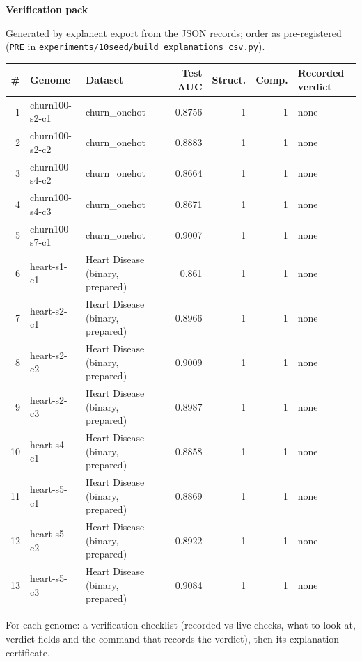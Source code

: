 \documentclass[a4paper,11pt]{article}
\begin{document}
\begin{titlepage}
\centering
{\Large\bfseries Verification pack\par}
\vspace{6mm}
{\small Generated by explaneat export from the JSON records; order as pre-registered (\texttt{PRE} in \texttt{experiments/10seed/build\_explanations\_csv.py}).\par}
\vspace{8mm}
\begin{tabular}{@{}rllrrrl@{}}
\toprule
\# & Genome & Dataset & Test AUC & Struct. & Comp. & Recorded verdict \\
\midrule
1 & churn100-s2-c1 & churn\_\allowbreak{}onehot & 0.8756 & 1 & 1 & none \\
2 & churn100-s2-c2 & churn\_\allowbreak{}onehot & 0.8883 & 1 & 1 & none \\
3 & churn100-s4-c2 & churn\_\allowbreak{}onehot & 0.8664 & 1 & 1 & none \\
4 & churn100-s4-c3 & churn\_\allowbreak{}onehot & 0.8671 & 1 & 1 & none \\
5 & churn100-s7-c1 & churn\_\allowbreak{}onehot & 0.9007 & 1 & 1 & none \\
6 & heart-s1-c1 & Heart Disease (binary, prepared) & 0.861 & 1 & 1 & none \\
7 & heart-s2-c1 & Heart Disease (binary, prepared) & 0.8966 & 1 & 1 & none \\
8 & heart-s2-c2 & Heart Disease (binary, prepared) & 0.9009 & 1 & 1 & none \\
9 & heart-s2-c3 & Heart Disease (binary, prepared) & 0.8987 & 1 & 1 & none \\
10 & heart-s4-c1 & Heart Disease (binary, prepared) & 0.8858 & 1 & 1 & none \\
11 & heart-s5-c1 & Heart Disease (binary, prepared) & 0.8869 & 1 & 1 & none \\
12 & heart-s5-c2 & Heart Disease (binary, prepared) & 0.8922 & 1 & 1 & none \\
13 & heart-s5-c3 & Heart Disease (binary, prepared) & 0.9084 & 1 & 1 & none \\
\bottomrule
\end{tabular}
\vspace{8mm}
\par{\small For each genome: a verification checklist (recorded vs live checks, what to look at, verdict fields and the command that records the verdict), then its explanation certificate.\par}
\end{titlepage}
\tableofcontents
\clearpage
\end{document}
